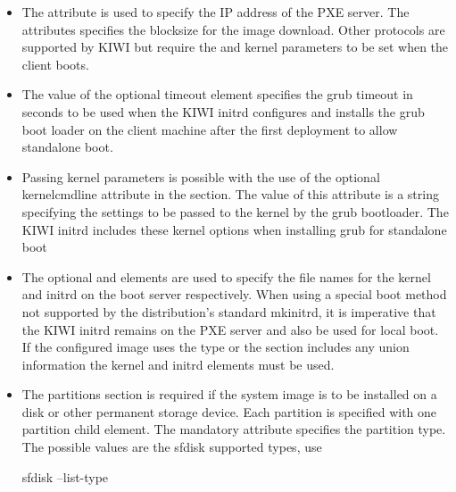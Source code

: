 \begin{itemize}
	\begin {itemize}
	\item The  attribute is used to specify the IP address
      of the PXE server. The  attributes specifies the
      blocksize for the image download. Other protocols are supported by
      KIWI but require the  and 
      kernel parameters to be set when the client boots.
	\item The value of the optional timeout element specifies the grub
      timeout in seconds to be used when the KIWI initrd configures and
      installs the grub boot loader on the client machine after the first
      deployment to allow standalone boot.
	\item Passing kernel parameters is possible with the use of the
      optional kernelcmdline attribute in the  section. The value
      of this attribute is a string specifying the settings to be
      passed to the kernel by the grub bootloader. The KIWI initrd
      includes these kernel options when installing grub for standalone boot
	\item The optional  and  elements are
      used to specify the file names for the kernel and initrd on the boot
      server respectively. When using a special boot method not supported
      by the distribution's standard mkinitrd, it is imperative that the
      KIWI initrd remains on the PXE server and also be used for local boot.
      If the configured image uses the  type or the 
      section includes any union information the kernel and initrd elements
      must be used.
	\item The partitions section is required if the system image is to be
      installed on a disk or other permanent storage device. Each partition
      is specified with one partition child element. The mandatory
       attribute specifies the partition type. The possible
      values are the sfdisk supported types, use
      
      \begin{Command}{14cm}
      sfdisk --list-type
      \end{Command}
      

\end{itemize}
\end{itemize}
